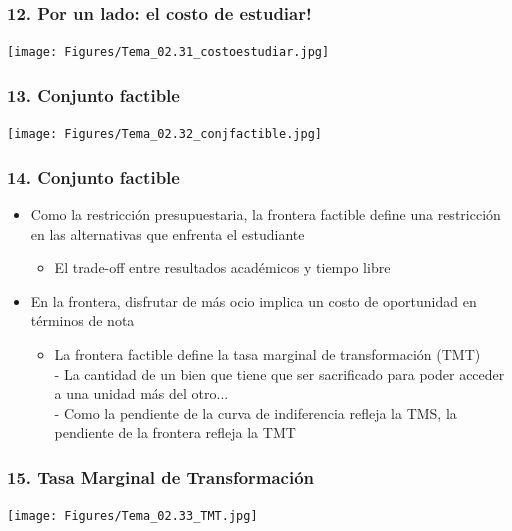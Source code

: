 \documentclass[14pt]{beamer}
\begin{document}
\begin{frame}
\frametitle{12. Por un lado: el costo de estudiar!}
\centering
\texttt{[image: Figures/Tema\_02.31\_costoestudiar.jpg]}
\end{frame}

\begin{frame}
\frametitle{13. Conjunto factible}
\centering
\texttt{[image: Figures/Tema\_02.32\_conjfactible.jpg]}
\end{frame}

\begin{frame}
\frametitle{14. Conjunto factible}
\begin{itemize}
    \item Como la restricción presupuestaria, la frontera factible define una restricción en las alternativas que enfrenta el estudiante
        \begin{itemize}
        \item El trade-off entre resultados académicos y tiempo libre
        \end{itemize}
    \item En la frontera, disfrutar de más ocio implica un costo de oportunidad en términos de nota
        \begin{itemize}
        \item La frontera factible define la tasa marginal de transformación (TMT) \\ 
        - La cantidad de un bien que tiene que ser sacrificado para poder acceder a una unidad más del otro... \\ 
        - Como la pendiente de la curva de indiferencia refleja la TMS, la pendiente de la frontera refleja la TMT
        \end{itemize}
\end{itemize} 
\end{frame}

\begin{frame}
\frametitle{15. Tasa Marginal de Transformación}
\centering
\texttt{[image: Figures/Tema\_02.33\_TMT.jpg]}
\end{frame}
\end{document}
